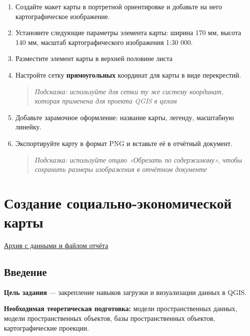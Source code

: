 \documentclass[
  12pt,
]{book}
\begin{document}
\begin{enumerate}
\def\labelenumi{\arabic{enumi}.}
\setcounter{enumi}{6}
\item
  Создайте макет карты в портретной ориентировке и добавьте на него картографическое изображение.
\item
  Установите следующие параметры элемента карты: ширина 170 мм, высота 140 мм, масштаб картографического изображения 1:30 000.
\item
  Разместите элемент карты в верхней половине листа
\item
  Настройте сетку \textbf{прямоугольных} координат для карты в виде перекрестий.

  \begin{quote}
  \emph{Подсказка: используйте для сетки ту же систему координат, которая применена для проекта QGIS в целом}
  \end{quote}
\item
  Добавьте зарамочное оформление: название карты, легенду, масштабную линейку.
\item
  Экспортируйте карту в формат PNG и вставьте её в отчётный документ.

  \begin{quote}
  \emph{Подсказка: используйте опцию «Обрезать по содержимому», чтобы сохранить размеры изображения в отчётном документе}
  \end{quote}
\end{enumerate}

\hypertarget{map-design-population}{%
\chapter{Создание социально-экономической карты}\label{map-design-population}}

\href{https://1drv.ms/u/s!AmtmZDq3JgxHgZkCX20q_RZQo7SXWQ?e=k0InAb}{Архив с данными и файлом отчёта}

\hypertarget{map-design-population-intro}{%
\section{Введение}\label{map-design-population-intro}}

\textbf{Цель задания} --- закрепление навыков загрузки и визуализации данных в QGIS.

\textbf{Необходимая теоретическая подготовка:} модели пространственных данных, модели пространственных объектов, базы пространственных объектов, картографические проекции.
\end{document}
